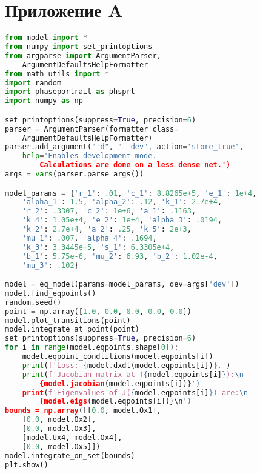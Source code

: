 	\section*{Приложение A}

\begin{lstlisting}[language=Python, showstringspaces=false, caption=Листинг Файла \texttt{run.py}.]
from model import *
from numpy import set_printoptions
from argparse import ArgumentParser, 
	ArgumentDefaultsHelpFormatter
from math_utils import *
import random
import phaseportrait as phsprt
import numpy as np

set_printoptions(suppress=True, precision=6)
parser = ArgumentParser(formatter_class=
	ArgumentDefaultsHelpFormatter)
parser.add_argument("-d", "--dev", action='store_true', 
	help='Enables development mode. 
		Calculations are done on a less dense net.')
args = vars(parser.parse_args())

model_params = {'r_1': .01, 'c_1': 8.8265e+5, 'e_1': 1e+4,
	'alpha_1': 1.5, 'alpha_2': .12, 'k_1': 2.7e+4, 
	'r_2': .3307, 'c_2': 1e+6, 'a_1': .1163, 
	'k_4': 1.05e+4, 'e_2': 1e+4, 'alpha_3': .0194, 
	'k_2': 2.7e+4, 'a_2': .25, 'k_5': 2e+3, 
	'mu_1': .007, 'alpha_4': .1694, 
	'k_3': 3.3445e+5, 's_1': 6.3305e+4,
	'b_1': 5.75e-6, 'mu_2': 6.93, 'b_2': 1.02e-4,
	'mu_3': .102}

model = eq_model(params=model_params, dev=args['dev'])
model.find_eqpoints()
random.seed()
point = np.array([1.0, 0.0, 0.0, 0.0, 0.0])
model.plot_transitions(point)
model.integrate_at_point(point)
set_printoptions(suppress=True, precision=6)
for i in range(model.eqpoints.shape[0]):
	model.eqpoint_condtitions(model.eqpoints[i])
	print(f'Loss: {model.dxdt(model.eqpoints[i])}.')
	print(f'Jacobian matrix at ({model.eqpoints[i]}):\n
		{model.jacobian(model.eqpoints[i])}')
	print(f'Eigenvalues of J({model.eqpoints[i]}) are:\n
		{model.eigs(model.eqpoints[i])}\n')
bounds = np.array([[0.0, model.Ox1], 
	[0.0, model.Ox2], 
	[0.0, model.Ox3], 
	[model.Ux4, model.Ox4], 
	[0.0, model.Ox5]])
model.integrate_on_set(bounds)
plt.show()
\end{lstlisting}
\newpage
